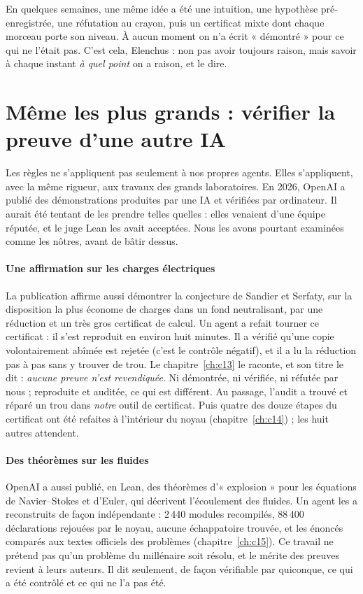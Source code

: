\begin{encadre}
En quelques semaines, une même idée a été une intuition, une hypothèse pré-enregistrée, une réfutation au crayon, puis
un certificat mixte dont chaque morceau porte son niveau. À aucun moment on n'a écrit « démontré » pour ce qui ne
l'était pas. C'est cela, Elenchus : non pas avoir toujours raison, mais savoir à chaque instant \emph{à quel point} on
a raison, et le dire.
\end{encadre}

\section{Même les plus grands : vérifier la preuve d'une autre IA}

Les règles ne s'appliquent pas seulement à nos propres agents. Elles s'appliquent, avec la même rigueur, aux travaux
des grands laboratoires. En 2026, OpenAI a publié des démonstrations produites par une IA et vérifiées par
ordinateur. Il aurait été tentant de les prendre telles quelles : elles venaient d'une équipe réputée, et le juge
Lean les avait acceptées. Nous les avons pourtant examinées comme les nôtres, avant de bâtir dessus.

\paragraph{Une affirmation sur les charges électriques} La publication affirme aussi démontrer la conjecture de
Sandier et Serfaty, sur la disposition la plus économe de charges dans un fond neutralisant, par une réduction et un
très gros certificat de calcul. Un agent a refait tourner ce certificat : il s'est reproduit en environ huit minutes.
Il a vérifié qu'une copie volontairement abîmée est rejetée (c'est le contrôle négatif), et il a lu la réduction pas à
pas sans y trouver de trou. Le chapitre~\ref{ch:c13} le raconte, et son titre le dit : \emph{aucune preuve n'est
revendiquée}. Ni démontrée, ni vérifiée, ni réfutée par nous ; reproduite et auditée, ce qui est différent. Au passage,
l'audit a trouvé et réparé un trou dans \emph{notre} outil de certificat. Puis quatre des douze étapes du certificat
ont été refaites à l'intérieur du noyau (chapitre~\ref{ch:c14}) ; les huit autres attendent.

\paragraph{Des théorèmes sur les fluides} OpenAI a aussi publié, en Lean, des théorèmes d'« explosion » pour les
équations de Navier--Stokes et d'Euler, qui décrivent l'écoulement des fluides. Un agent les a reconstruits de façon
indépendante : 2\,440 modules recompilés, 88\,400 déclarations rejouées par le noyau, aucune échappatoire trouvée, et
les énoncés comparés aux textes officiels des problèmes (chapitre~\ref{ch:c15}). Ce travail ne prétend pas qu'un
problème du millénaire soit résolu, et le mérite des preuves revient à leurs auteurs. Il dit seulement, de façon
vérifiable par quiconque, ce qui a été contrôlé et ce qui ne l'a pas été.

